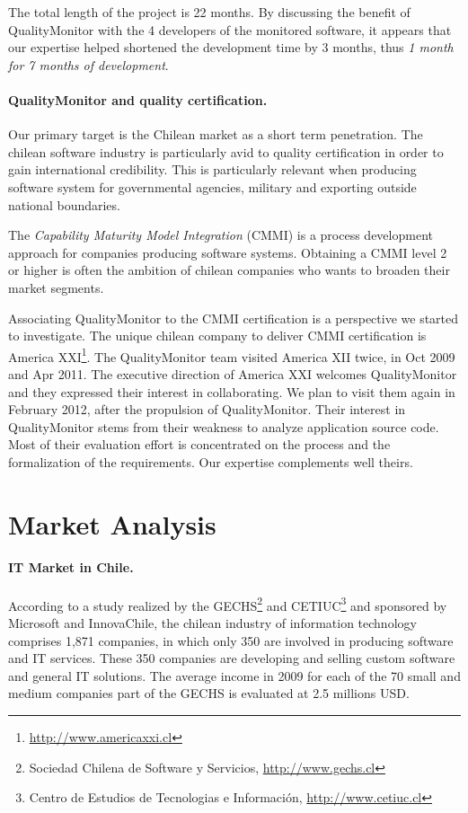 \documentclass[runningheads]{llncs}
\begin{document}
The total length of the project is 22 months. By discussing the benefit of QualityMonitor with the 4 developers of the monitored software, it appears that our expertise helped shortened the development time by 3 months, thus \emph{1 month for 7 months of development}. 

\paragraph{QualityMonitor and quality certification.}
Our primary target is the Chilean market as a short term penetration. The chilean software industry is particularly avid to quality certification in order to gain international credibility. This is particularly relevant when producing software system for governmental agencies, military and exporting outside national boundaries.

The \emph{Capability Maturity Model Integration} (CMMI) is a process development approach for companies producing software systems. Obtaining a CMMI level 2 or higher is often the ambition of chilean companies who wants to broaden their market segments.

Associating QualityMonitor to the CMMI certification is a perspective we started to investigate. The unique chilean company to deliver CMMI certification is America XXI\footnote{\url{http://www.americaxxi.cl}}. The QualityMonitor team visited America XII twice, in Oct 2009 and Apr 2011. The executive direction of America XXI welcomes QualityMonitor and they expressed their interest in collaborating. We plan to visit them again in February 2012, after the propulsion of QualityMonitor. Their interest in QualityMonitor stems from their weakness to analyze application source code. Most of their evaluation effort is concentrated on the process and the formalization of the requirements. Our expertise complements well theirs.



\section{Market Analysis}

\paragraph{IT Market in Chile.}
According to a study realized by the GECHS\footnote{Sociedad Chilena de Software y Servicios, \url{http://www.gechs.cl}} and CETIUC\footnote{Centro de Estudios de Tecnologias e Informaci\'on, \url{http://www.cetiuc.cl}} and sponsored by Microsoft and InnovaChile, the chilean industry of information technology comprises 1,871 companies, in which only 350 are involved in producing software and IT services. These 350 companies are developing and selling custom software and general IT solutions. 
The average income in 2009 for each of the 70 small and medium companies part of the GECHS is evaluated at 2.5 millions USD.
\end{document}
